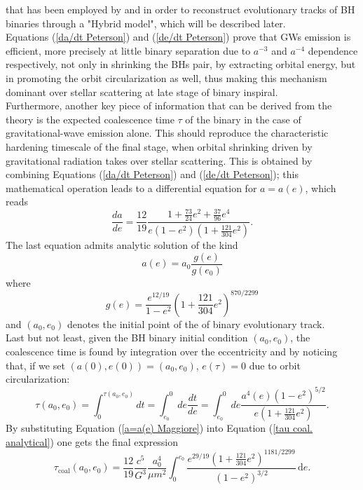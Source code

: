 that has been employed by \textcite{Quinlan_1996} and \textcite{Sesana_2010} in order to reconstruct evolutionary tracks of BH binaries through a "Hybrid model", which will be described later.\\Equations (\ref{da/dt Peterson}) and (\ref{de/dt Peterson}) prove that GWs emission  is efficient, more precisely at little binary separation due to $a^{-3}$ and $a^{-4}$ dependence respectively, not only in shrinking the BHs pair, by extracting orbital energy, but in promoting the orbit circularization as well, thus making this mechanism dominant over stellar scattering at late stage of binary inspiral.\\Furthermore, another key piece of information that can be derived from the theory is the expected coalescence time $\tau$ of the binary in the case of gravitational-wave emission alone. This should reproduce the characteristic hardening timescale of the final stage, when orbital shrinking driven by gravitational radiation takes over stellar scattering. This is obtained by combining Equations (\ref{da/dt Peterson}) and (\ref{de/dt Peterson}); this mathematical operation leads to a differential equation for $a=a(e)$, which reads
\begin{equation}\label{da/de Maggiore}
    \frac{da}{de}=\frac{12}{19}\frac{1+\frac{73}{24}e^2+\frac{37}{96}e^4}{e(1-e^2)\left(1+\frac{121}{304}e^2\right)}.
\end{equation}
The last equation admits analytic solution of the kind
\begin{equation}\label{a=a(e) Maggiore}
    a(e)=a_0\frac{g(e)}{g(e_0)}
\end{equation}
where 
\begin{equation}\label{g(e) Maggiore}
    g(e)=\frac{e^{12/19}}{1-e^2}\left(1+\frac{121}{304}e^2\right)^{870/2299}
\end{equation}
and $(a_0,e_0)$ denotes the initial point of the of binary evolutionary track.\\Last but not least, given the BH binary initial condition $(a_0,e_0)$, the coalescence time is found by integration over the eccentricity and by noticing that, if we set $(a(0),e(0))=(a_0,e_0)$, $e(\tau)=0$ due to orbit circularization:
\begin{equation}\label{tau coal. analytical}
\tau(a_0,e_0)=\int_0^{\tau(a_0,e_0)}dt=\int_{e_0}^{0}de \frac{dt}{de}=\int_{e_0}^{0}de \frac{a^4(e)(1-e^2)^{5/2}}{e\left(1+\frac{121}{304}e^2\right)}.
\end{equation}
By substituting Equation (\ref{a=a(e) Maggiore}) into Equation (\ref{tau coal. analytical}) one gets the final expression
\begin{equation}\label{t_coal Maggiore} 
\tau_{\mathrm{coal}}(a_0,e_0)
=
\frac{12}{19}
\frac{c^5}{G^3}
\frac{a_0^4}{\mu m^2}
\int_{0}^{e_0}
\frac{e^{29/19}
\left(1+\frac{121}{304}e^2\right)^{1181/2299}}
{(1-e^2)^{3/2}}
\,\mathrm{d}e.
\end{equation}





